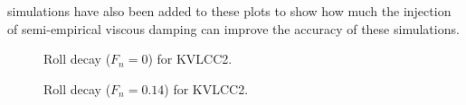 simulations have also been added to these plots to show how much the injection of semi-empirical viscous damping can improve the accuracy of these simulations.
\begin{figure}[h]
\caption{Roll decay ($F_n=0$) for KVLCC2.}
\label{fig:hybrid_0_time}
\end{figure}
\begin{figure}[h]
\caption{Roll decay ($F_n=0.14$) for KVLCC2.}
\label{fig:hybrid_speed_time}
\end{figure}
\clearpage